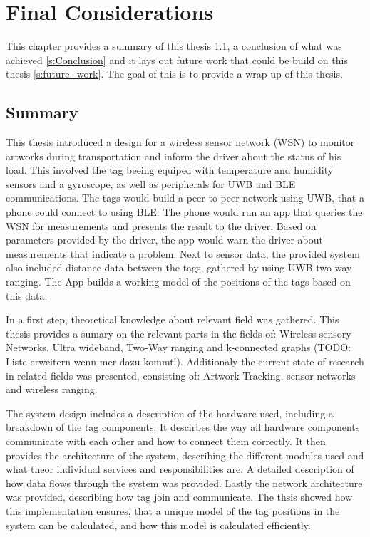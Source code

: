 \chapter{Final Considerations}
\label{chap:considerations}

This chapter provides a summary of this thesis \ref{s:sumary}, a conclusion of what was achieved \ref{s:Conclusion} and it lays out future work that could be build on this thesis \ref{s:future_work}.
The goal of this is to provide a wrap-up of this thesis.

\section{Summary}
\label{s:sumary}

This thesis introduced a design for a wireless sensor network (WSN) to monitor artworks during transportation and inform the driver about the status of his load.
This involved the tag beeing equiped with temperature and humidity sensors and a gyroscope, as well as peripherals for UWB and BLE communications.
The tags would build a peer to peer network using UWB, that a phone could connect to using BLE.
The phone would run an app that queries the WSN for measurements and presents the result to the driver.
Based on parameters provided by the driver, the app would warn the driver about measurements that indicate a problem.
Next to sensor data, the provided system also included distance data between the tags, gathered by using UWB two-way ranging.
The App builds a working model of the positions of the tags based on this data.


In a first step, theoretical knowledge about relevant field was gathered.
This thesis provides a sumary on the relevant parts in the fields of: Wireless sensory Networks, Ultra wideband, Two-Way ranging and k-connected graphs (TODO: Liste erweitern wenn mer dazu kommt!).
Additionaly the current state of research in related fields was presented, consisting of: Artwork Tracking, sensor networks and wireless ranging.


The system design includes a description of the hardware used, including a breakdown of the tag components. It descirbes the way all hardware components communicate with each other and how to connect them correctly.
It then provides the architecture of the system, describing the different modules used and what theor individual services and responsibilities are.
A detailed description of how data flows through the system was provided.
Lastly the network architecture was provided, describing how tag join and communicate. The thsis showed how this implementation ensures, that a unique model of the tag positions in the system can be calculated, and how this model is calculated efficiently.


